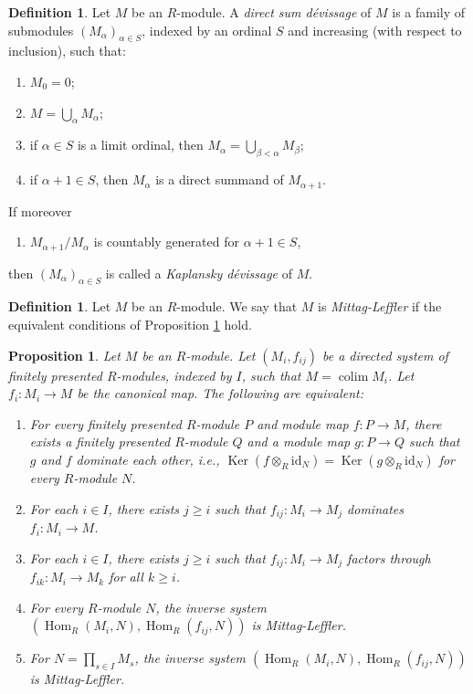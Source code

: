 \documentclass{amsart}
\theoremstyle{plain}
\newtheorem{proposition}[subsection]{Proposition}
\theoremstyle{definition}
\newtheorem{definition}[subsection]{Definition}
\theoremstyle{remark}
\numberwithin{equation}{subsection}
\def\colim{\mathop{\mathrm{colim}}\nolimits}
\def\Hom{\mathop{\mathrm{Hom}}\nolimits}
\def\Ker{\mathop{\mathrm{Ker}}}
\begin{document}
\begin{definition}
\label{algebra-definition-devissage}
Let $M$ be an $R$-module.  A {\it direct sum d\'evissage} of $M$ is a family
of submodules $(M_{\alpha})_{\alpha \in S}$, indexed by an ordinal $S$ and
increasing (with respect to inclusion), such that:
\begin{enumerate}
\item[(0)] $M_0 = 0$;
\item[(1)] $M = \bigcup_{\alpha} M_{\alpha}$;
\item[(2)] if $\alpha \in S$ is a limit ordinal, then $M_{\alpha} =
\bigcup_{\beta < \alpha} M_{\beta}$;
\item[(3)] if $\alpha + 1 \in S$, then $M_{\alpha}$ is a direct summand of
$M_{\alpha + 1}$.
\end{enumerate}
If moreover
\begin{enumerate}
\item[(4)] $M_{\alpha + 1}/M_{\alpha}$ is countably generated for
$\alpha + 1 \in S$,
\end{enumerate}
then $(M_{\alpha})_{\alpha \in S}$ is called a {\it Kaplansky d\'evissage}
of $M$.
\end{definition}

\begin{definition}
\label{algebra-definition-mittag-leffler-module}
Let $M$ be an $R$-module.  We say that $M$ is {\it Mittag-Leffler} if the
equivalent conditions of
Proposition \ref{algebra-proposition-ML-characterization}
hold.
\end{definition}

\begin{proposition}
\label{algebra-proposition-ML-characterization}
Let $M$ be an $R$-module.  Let $(M_i, f_{ij})$ be a directed system of finitely
presented $R$-modules, indexed by $I$, such that $M = \colim M_i$.  Let
$f_i:
M_i \to M$ be the canonical map.  The following are equivalent:
\begin{enumerate}
\item For every finitely presented $R$-module $P$ and module map $f: P
\to M$, there exists a finitely presented $R$-module $Q$ and a module
map $g: P \to Q$ such that $g$ and $f$ dominate each other, i.e.,
$\Ker(f \otimes_R \text{id}_N) = \Ker(g \otimes_R \text{id}_N)$
for every $R$-module $N$.
\item For each $i \in I$, there exists $j \geq i$ such that $f_{ij}: M_i
\to M_j$ dominates $f_i: M_i \to M$.
\item For each $i \in I$, there exists $j \geq i$ such that $f_{ij}: M_i
\to M_j$ factors through $f_{ik}: M_i \to M_k$ for all $k \geq
i$.
\item For every $R$-module $N$, the inverse system
$(\Hom_R(M_i, N), \Hom_R(f_{ij}, N))$ is Mittag-Leffler.
\item For $N = \prod_{s \in I} M_s$, the inverse system
$(\Hom_R(M_i, N), \Hom_R(f_{ij}, N))$ is Mittag-Leffler.
\end{enumerate}
\end{proposition}
\end{document}
